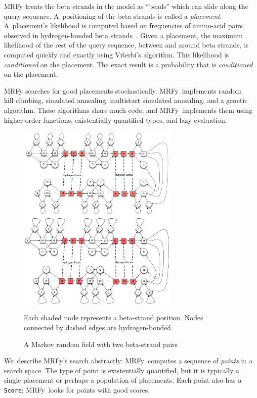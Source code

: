 \documentclass[preprint,nonatbib,blockstyle,times]{sigplanconf}
\newcommand\mrfy{MRFy} %
\let\cite\citep
\begin{document}
MRFy treats the beta 
strands in the model
 as ``beads'' which can slide along the query sequence.
A~positioning of the beta strands is called
 a \emph{placement}.
A~placement's likelihood is computed
based on frequencies of amino-acid pairs observed in 
hydrogen-bonded beta strands~\cite{Cowen:2002p588}.
Given a placement, the maximum likelihood of the rest of
the query sequence, between and around beta strands,
is computed quickly and exactly 
using Viterbi's algorithm.
\ifpagetuning
This likelihood is \emph{conditioned} on the placement.
\else
The exact result is a probability that is
\emph{conditioned} on the placement.
\fi

MRFy searches for good placements stochastically.
\mrfy\ implements
random hill
climbing, simulated  
annealing, multistart simulated annealing, and a genetic algorithm.
These algorithms share much code, and \mrfy\ implements them using
higher-order functions, 
existentially 
quantified types, and lazy evaluation.


\begin{figure}
\ifpdfmadness
\centerline{\includegraphics[width=7.8cm]{mrf_interleave_diagram.pdf}} 
\else
\centerline{\includegraphics[width=7.8cm]{mrf_interleave_diagram.eps}} 
\fi
Each shaded node represents a beta-strand position.
Nodes connected by dashed edges are hydrogen-bonded.

\caption{A Markov random field with two beta-strand pairs}
\label{mrf} 
\end{figure}



We~describe \mrfy's search abstractly: \mrfy\ computes a sequence
of \emph{points} in a search space.
The type of point is existentially quantified, but it is typically
a single placement or perhaps a population of placements. 
Each point also has a \texttt{Score}; \mrfy\ looks for points with
good scores.
\end{document}
